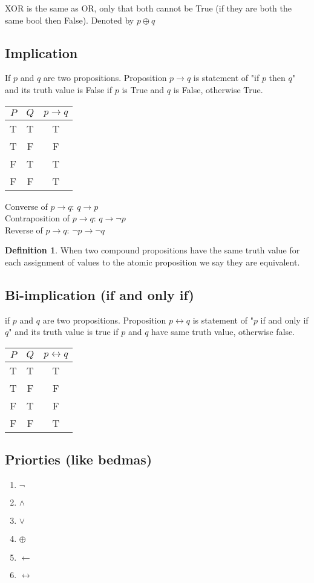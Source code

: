 \documentclass[11pt]{article}
\theoremstyle{definition}
\newtheorem{defn}{Definition}
\begin{document}
XOR is the same as OR, only that both cannot be True (if they are both the same bool then False). Denoted by $p \oplus q$

\subsection{Implication}
If $p$ and $q$ are two propositions. Proposition $p \rightarrow q$ is statement of "if $p$ then $q$" and its truth value is False if $p$ is True and $q$ is False, otherwise True.
\begin{center}
	\begin{tabular}{ |c|c|c|} 
 		\hline
 		$P$ & $Q$ & $p \rightarrow q$  \\
		\hline
 		T & T  & T \\
 		T & F & F \\
		F & T & T \\
		F & F & T \\
 		\hline
	\end{tabular}
\end{center}
Converse of $p \rightarrow q$: $q \rightarrow p$ \\
Contraposition of $p \rightarrow q$: $q \rightarrow \neg p$ \\
Reverse of $p \rightarrow q$: $\neg p \rightarrow \neg q$

\begin{defn}
When two compound propositions have the same truth value for each assignment of values to the atomic proposition we say they are equivalent. 
\end{defn}
\subsection{Bi-implication (if and only if)}
if $p$ and $q$ are two propositions. Proposition $p \longleftrightarrow q$ is statement of "$p$ if and only if$q$" and its truth value is true if $p$ and $q$ have same truth value, otherwise false. 
\begin{center}
	\begin{tabular}{ |c|c|c|} 
 		\hline
 		$P$ & $Q$ & $p \longleftrightarrow q$  \\
		\hline
 		T & T  & T \\
 		T & F & F \\
		F & T & F \\
		F & F & T \\
 		\hline
	\end{tabular}
\end{center}
\subsection{Priorties (like bedmas)} 
\begin{enumerate}
\item $\neg$
\item $\land$
\item $\lor$
\item $\oplus$
\item $\leftarrow$
\item $\longleftrightarrow$
\end{enumerate}
\end{document}
